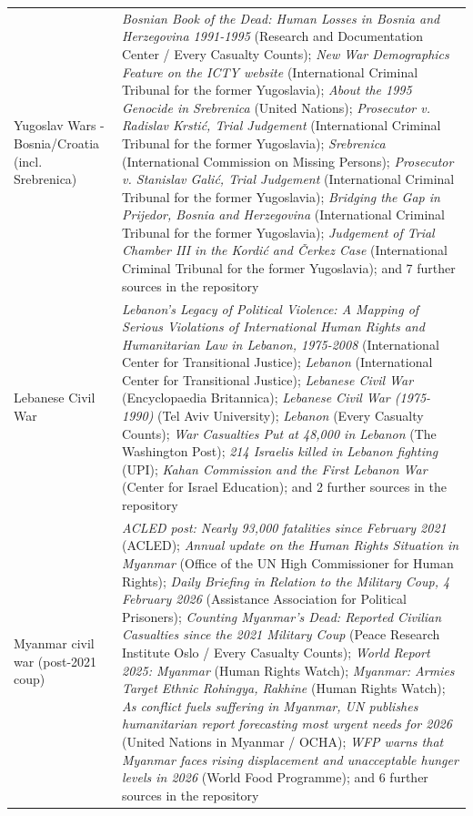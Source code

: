 \documentclass[11pt]{article}
\begin{document}
\begin{scriptsize}
\begin{longtable}{p{3.5cm} p{12.5cm}}
\addlinespace
Yugoslav Wars - Bosnia/Croatia (incl. Srebrenica) & \emph{Bosnian Book of the Dead: Human Losses in Bosnia and Herzegovina 1991-1995} (Research and Documentation Center / Every Casualty Counts); \emph{New War Demographics Feature on the ICTY website} (International Criminal Tribunal for the former Yugoslavia); \emph{About the 1995 Genocide in Srebrenica} (United Nations); \emph{Prosecutor v. Radislav Krstić, Trial Judgement} (International Criminal Tribunal for the former Yugoslavia); \emph{Srebrenica} (International Commission on Missing Persons); \emph{Prosecutor v. Stanislav Galić, Trial Judgement} (International Criminal Tribunal for the former Yugoslavia); \emph{Bridging the Gap in Prijedor, Bosnia and Herzegovina} (International Criminal Tribunal for the former Yugoslavia); \emph{Judgement of Trial Chamber III in the Kordić and Čerkez Case} (International Criminal Tribunal for the former Yugoslavia); and 7 further sources in the repository \\
\addlinespace
Lebanese Civil War & \emph{Lebanon's Legacy of Political Violence: A Mapping of Serious Violations of International Human Rights and Humanitarian Law in Lebanon, 1975-2008} (International Center for Transitional Justice); \emph{Lebanon} (International Center for Transitional Justice); \emph{Lebanese Civil War} (Encyclopaedia Britannica); \emph{Lebanese Civil War (1975-1990)} (Tel Aviv University); \emph{Lebanon} (Every Casualty Counts); \emph{War Casualties Put at 48,000 in Lebanon} (The Washington Post); \emph{214 Israelis killed in Lebanon fighting} (UPI); \emph{Kahan Commission and the First Lebanon War} (Center for Israel Education); and 2 further sources in the repository \\
\addlinespace
Myanmar civil war (post-2021 coup) & \emph{ACLED post: Nearly 93,000 fatalities since February 2021} (ACLED); \emph{Annual update on the Human Rights Situation in Myanmar} (Office of the UN High Commissioner for Human Rights); \emph{Daily Briefing in Relation to the Military Coup, 4 February 2026} (Assistance Association for Political Prisoners); \emph{Counting Myanmar’s Dead: Reported Civilian Casualties since the 2021 Military Coup} (Peace Research Institute Oslo / Every Casualty Counts); \emph{World Report 2025: Myanmar} (Human Rights Watch); \emph{Myanmar: Armies Target Ethnic Rohingya, Rakhine} (Human Rights Watch); \emph{As conflict fuels suffering in Myanmar, UN publishes humanitarian report forecasting most urgent needs for 2026} (United Nations in Myanmar / OCHA); \emph{WFP warns that Myanmar faces rising displacement and unacceptable hunger levels in 2026} (World Food Programme); and 6 further sources in the repository \\

\end{longtable}
\end{scriptsize}
\end{document}
